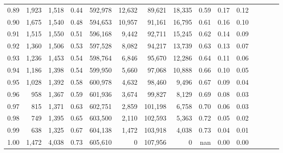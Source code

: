 \begin{tabular}{rrrcrrrrrrrrrrr}
0.89 &   1,923 &  1,518 &                                       0.44 &  592,978 &   12,632 &   89,621 &   18,335 &  0.59 &  0.17 &                         0.12 \\
0.90 &   1,675 &  1,540 &                                       0.48 &  594,653 &   10,957 &   91,161 &   16,795 &  0.61 &  0.16 &                         0.10 \\
0.91 &   1,515 &  1,550 &                                       0.51 &  596,168 &    9,442 &   92,711 &   15,245 &  0.62 &  0.14 &                         0.09 \\
0.92 &   1,360 &  1,506 &                                       0.53 &  597,528 &    8,082 &   94,217 &   13,739 &  0.63 &  0.13 &                         0.07 \\
0.93 &   1,236 &  1,453 &                                       0.54 &  598,764 &    6,846 &   95,670 &   12,286 &  0.64 &  0.11 &                         0.06 \\
0.94 &   1,186 &  1,398 &                                       0.54 &  599,950 &    5,660 &   97,068 &   10,888 &  0.66 &  0.10 &                         0.05 \\
0.95 &   1,028 &  1,392 &                                       0.58 &  600,978 &    4,632 &   98,460 &    9,496 &  0.67 &  0.09 &                         0.04 \\
0.96 &     958 &  1,367 &                                       0.59 &  601,936 &    3,674 &   99,827 &    8,129 &  0.69 &  0.08 &                         0.03 \\
0.97 &     815 &  1,371 &                                       0.63 &  602,751 &    2,859 &  101,198 &    6,758 &  0.70 &  0.06 &                         0.03 \\
0.98 &     749 &  1,395 &                                       0.65 &  603,500 &    2,110 &  102,593 &    5,363 &  0.72 &  0.05 &                         0.02 \\
0.99 &     638 &  1,325 &                                       0.67 &  604,138 &    1,472 &  103,918 &    4,038 &  0.73 &  0.04 &                         0.01 \\
1.00 &   1,472 &  4,038 &                                       0.73 &  605,610 &        0 &  107,956 &        0 &   nan &  0.00 &                         0.00 \\
\bottomrule
\end{tabular}

